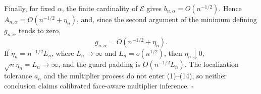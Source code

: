 Finally, for fixed \(\alpha\), the finite cardinality of \(\mathcal E\) gives \(b_{n,\alpha}=O(n^{-1/2})\).  Hence \(A_{n,\alpha}=O(n^{-1/2}+\eta_n)\), and, since the second argument of the minimum defining \(g_{n,\alpha}\) tends to zero,
\[
g_{n,\alpha}=O(n^{-1/2}+\eta_n).
\]
If \(\eta_n=n^{-1/2}L_n\), where \(L_n\to\infty\) and \(L_n=o(n^{1/2})\), then \(\eta_n\downarrow0\), \(\sqrt n\eta_n=L_n\to\infty\), and the guard padding is \(O(n^{-1/2}L_n)\).  The localization tolerance \(a_n\) and the multiplier process do not enter (1)--(14), so neither conclusion claims calibrated face-aware multiplier inference. \(\square\)